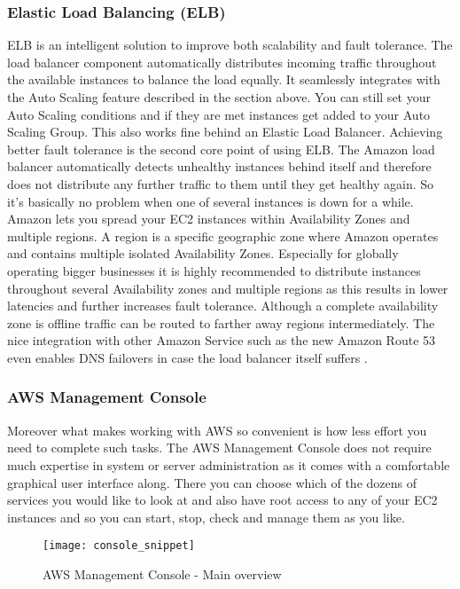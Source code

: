 \subsubsection{Elastic Load Balancing (ELB)}
ELB is an intelligent solution to improve both scalability and fault tolerance. The load balancer component automatically distributes incoming traffic throughout the available instances to balance the load equally. It seamlessly integrates with the Auto Scaling feature described in the section above. You can still set your Auto Scaling conditions and if they are met instances get added to your Auto Scaling Group. This also works fine behind an Elastic Load Balancer. Achieving better fault tolerance is the second core point of using ELB. The Amazon load balancer automatically detects unhealthy instances behind itself and therefore does not distribute any further traffic to them until they get healthy again. So it's basically no problem when one of several instances is down for a while. Amazon lets you spread your EC2 instances within Availability Zones and multiple regions. A region is a specific geographic zone where Amazon operates and contains multiple isolated Availability Zones. Especially for globally operating bigger businesses it is highly recommended to distribute instances throughout several Availability zones and multiple regions as this results in lower latencies and further increases fault tolerance. Although a complete availability zone is offline traffic can be routed to farther away regions intermediately. The nice integration with other Amazon Service such as the new Amazon Route 53 even enables DNS failovers in case the load balancer itself suffers \cite{AWS_Overview}.

\subsubsection{AWS Management Console}
Moreover what makes working with AWS so convenient is how less effort you need to complete such tasks. The AWS Management Console does not require much expertise in system or server administration as it comes with a comfortable graphical user interface along. There you can choose which of the dozens of services you would like to look at and also have root access to any of your EC2 instances and so you can start, stop, check and manage them as you like.  
\begin{figure}
	\centering
		\texttt{[image: console\_snippet]}
	\caption{AWS Management Console - Main overview}
\end{figure}

